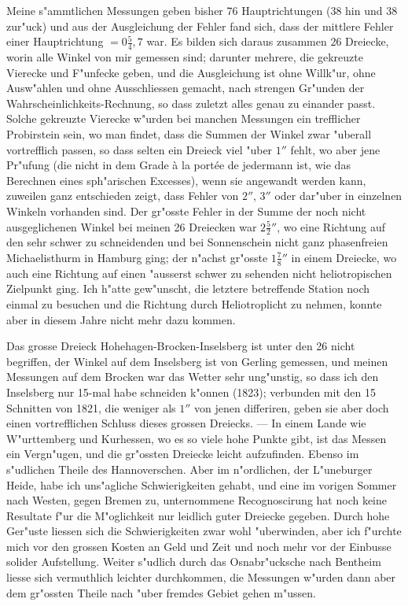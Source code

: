 \documentclass[12pt,a4paper]{article}
\theoremstyle{plain}
\theoremstyle{definition}
\theoremstyle{remark}
\begin{document}
Meine s"ammtlichen Messungen geben bisher 76 Hauptrichtungen (38 hin und 38 zur"uck) und aus der Ausgleichung der Fehler fand sich, dass der mittlere Fehler einer Hauptrichtung $= 0\frac{5}{4}\!\!\!,\!7$ war. Es bilden sich daraus zusammen 26 Dreiecke, worin alle Winkel von mir gemessen sind; darunter mehrere, die gekreuzte Vierecke und F"unfecke geben, und die Ausgleichung ist ohne Willk"ur, ohne Ausw"ahlen und ohne Ausschliessen gemacht, nach strengen Gr"unden der Wahrscheinlichkeits-Rechnung, so dass zuletzt alles genau zu einander passt. Solche gekreuzte Vierecke w"urden bei manchen Messungen ein trefflicher Probirstein sein, wo man findet, dass die Summen der Winkel zwar "uberall vortrefflich passen, so dass selten ein Dreieck viel "uber $1''$ fehlt, wo aber jene Pr"ufung (die nicht in dem Grade \`{a} la port\'{e}e de jedermann ist, wie das Berechnen eines sph"arischen Excesses), wenn sie angewandt werden kann, zuweilen ganz entschieden zeigt, dass Fehler von $2''$, $3''$ oder dar"uber in einzelnen Winkeln vorhanden sind. Der gr"osste Fehler in der Summe der noch nicht ausgeglichenen Winkel bei meinen 26 Dreiecken war $2\frac{5}{2}''$, wo eine Richtung auf den sehr schwer zu schneidenden und bei Sonnenschein nicht ganz phasenfreien Michaelisthurm in Hamburg ging; der n"achst gr"osste $1\frac{7}{8}''$ in einem Dreiecke, wo auch eine Richtung auf einen "ausserst schwer zu sehenden nicht heliotropischen Zielpunkt ging. Ich h"atte gew"unscht, die letztere betreffende Station noch einmal zu besuchen und die Richtung durch Heliotroplicht zu nehmen, konnte aber in diesem Jahre nicht mehr dazu kommen.

Das grosse Dreieck Hohehagen-Brocken-Inselsberg ist unter den 26 nicht begriffen, der Winkel auf dem Inselsberg ist von Gerling gemessen, und meinen Messungen auf dem Brocken war das Wetter sehr ung"unstig, so dass ich den Inselsberg nur 15-mal habe schneiden k"onnen (1823); verbunden mit den 15 Schnitten von 1821, die weniger als $1''$ von jenen differiren, geben sie aber doch einen vortrefflichen Schluss dieses grossen Dreiecks. --- In einem Lande wie W"urttemberg und Kurhessen, wo es so viele hohe Punkte gibt, ist das Messen ein Vergn"ugen, und die gr"ossten Dreiecke leicht aufzufinden. Ebenso im s"udlichen Theile des Hannoverschen. Aber im n"ordlichen, der L"uneburger Heide, habe ich uns"agliche Schwierigkeiten gehabt, und eine im vorigen Sommer nach Westen, gegen Bremen zu, unternommene Recognoscirung hat noch keine Resultate f"ur die M"oglichkeit nur leidlich guter Dreiecke gegeben. Durch hohe Ger"uste liessen sich die Schwierigkeiten zwar wohl "uberwinden, aber ich f"urchte mich vor den grossen Kosten an Geld und Zeit und noch mehr vor der Einbusse solider Aufstellung. Weiter s"udlich durch das Osnabr"ucksche nach Bentheim liesse sich vermuthlich leichter durchkommen, die Messungen w"urden dann aber dem gr"ossten Theile nach "uber fremdes Gebiet gehen m"ussen.
\end{document}
